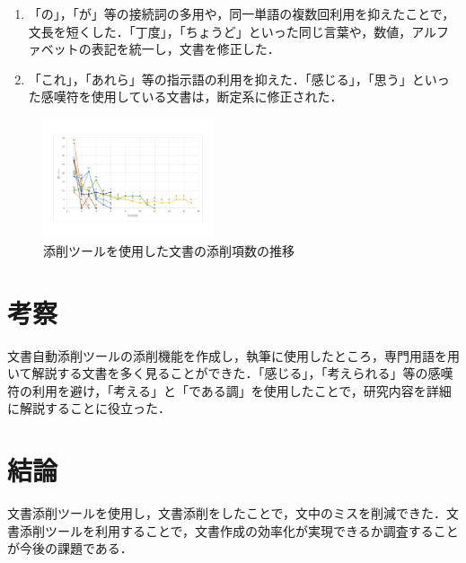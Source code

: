 \documentclass[uplatex,twocolumn,dvipdfmx]{jsarticle}
\begin{document}
\begin{enumerate}
\item 「の」，「が」等の接続詞の多用や，同一単語の複数回利用を抑えたことで，文長を短くした．「丁度」，「ちょうど」といった同じ言葉や，数値，アルファベットの表記を統一し，文書を修正した．
\item 「これ」，「あれら」等の指示語の利用を抑えた．「感じる」，「思う」といった感嘆符を使用している文書は，断定系に修正された．
\end{enumerate}

\begin{figure}[htb]
\centering
\includegraphics[width=5cm,clip]{redpen.pdf}
\caption{添削ツールを使用した文書の添削項数の推移}\label{conf}
\end{figure}

\section{考察}
文書自動添削ツールの添削機能を作成し，執筆に使用したところ，専門用語を用いて解説する文書を多く見ることができた．「感じる」，「考えられる」等の感嘆符の利用を避け，「考える」と「である調」を使用したことで，研究内容を詳細に解説することに役立った．

\section{結論}
文書添削ツールを使用し，文書添削をしたことで，文中のミスを削減できた．文書添削ツールを利用することで，文書作成の効率化が実現できるか調査することが今後の課題である．





\end{document}
